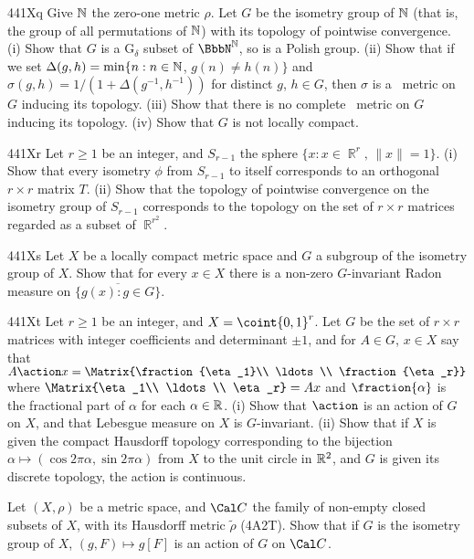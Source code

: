 {\sqheader 441Xq Give $\Bbb N$ the zero-one metric $\rho$.
Let $G$ be the isometry group of $\Bbb N$ (that
is, the group of all permutations of $\Bbb N$) with its
topology of pointwise convergence.
(i) Show that $G$ is a G$_{\delta}$ subset of $\NN$, so is a Polish
group.   (ii) Show that if we set $\Delta(g,h)=\min\{n:n\in\Bbb N$,
$g(n)\ne h(n)\}$
and $\sigma(g,h)=1/(1+\Delta(g^{-1},h^{-1}))$ for distinct $g$,
$h\in G$, then $\sigma$ is a \rti\ metric on $G$ inducing its topology.
(iii) Show that there
is no complete \rti\ metric on $G$ inducing its topology.   
(iv) Show that $G$ is not locally compact.

\sqheader 441Xr Let $r\ge 1$ be an integer, and $S_{r-1}$ the sphere
$\{x:x\in\BbbR^r,\,\|x\|=1\}$.   (i) Show that every isometry $\phi$
from $S_{r-1}$ to itself corresponds to an orthogonal $r\times r$ matrix
$T$.   
(ii) Show that the topology of pointwise convergence on the isometry
group of $S_{r-1}$ corresponds to the topology on the set of $r\times r$
matrices regarded as a subset of $\BbbR^{r^2}$.

\spheader 441Xs Let $X$ be a locally compact metric space and $G$ a
subgroup of the isometry group of $X$.   Show that for every $x\in X$
there is a non-zero $G$-invariant Radon measure on
$\overline{\{g(x):g\in G\}}$.

\spheader 441Xt Let $r\ge 1$ be an integer, and
$X=\coint{0,1}^r$.
Let $G$ be the set of $r\times r$ matrices with integer
coefficients and determinant $\pm 1$, and for $A\in G$, $x\in X$ say that
$A\action x=\Matrix{\fraction{\eta_1}\\ \ldots\\ \fraction{\eta_r}}$ where
$\Matrix{\eta_1\\ \ldots\\ \eta_r}=Ax$ and $\fraction{\alpha}$ is the
fractional part of $\alpha$ for each $\alpha\in\Bbb R$.
(i) Show that $\action$ is an action of $G$ on $X$, and that
Lebesgue measure on $X$ is $G$-invariant.
(ii) Show that if
$X$ is given the compact Hausdorff topology corresponding to the bijection
$\alpha\mapsto(\cos 2\pi\alpha,\sin 2\pi\alpha)$ from $X$ to the unit
circle in $\Bbb R^2$, and $G$ is given its discrete topology, the
action is continuous.

Let $(X,\rho)$ be a metric space, and $\Cal C$ the family of
non-empty closed
subsets of $X$, with its Hausdorff metric $\tilde\rho$ (4A2T).   Show
that if $G$ is the isometry group of $X$, $(g,F)\mapsto g[F]$ is an
action of $G$ on $\Cal C$.

}

